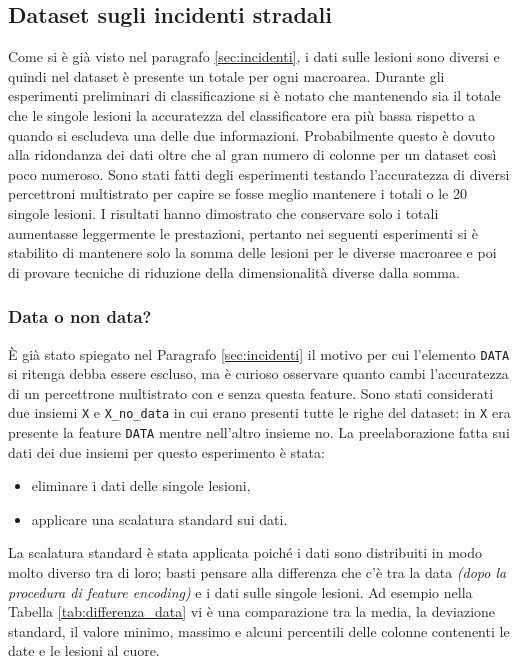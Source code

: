 \documentclass[12pt, twoside, letterpaper]{report}
\begin{document}
		\subsection{Dataset sugli incidenti stradali}
			Come si è già visto nel paragrafo \ref{sec:incidenti}, i dati sulle lesioni sono diversi e quindi nel dataset è presente un totale per ogni macroarea. Durante gli esperimenti preliminari di classificazione si è notato che mantenendo sia il totale che le singole lesioni la accuratezza del classificatore era più bassa rispetto a quando si escludeva una delle due informazioni. Probabilmente questo è dovuto alla ridondanza dei dati oltre che al gran numero di colonne per un dataset così poco numeroso. Sono stati fatti degli esperimenti testando l'accuratezza di diversi percettroni multistrato per capire se fosse meglio mantenere i totali o le 20 singole lesioni. I risultati hanno dimostrato che conservare solo i totali aumentasse leggermente le prestazioni, pertanto nei seguenti esperimenti si è stabilito di mantenere solo la somma delle lesioni per le diverse macroaree e poi di provare tecniche di riduzione della dimensionalità diverse dalla somma.
			
			\subsubsection{Data o non data?}			
				È già stato spiegato nel Paragrafo \ref{sec:incidenti} il motivo per cui l'elemento \texttt{DATA} si ritenga debba essere escluso, ma è curioso osservare quanto cambi l'accuratezza di un percettrone multistrato con e senza questa feature. Sono stati considerati due insiemi \texttt{X} e \texttt{X\_no\_data} in cui erano presenti tutte le righe del dataset: in \texttt{X} era presente la feature \texttt{DATA} mentre nell'altro insieme no. La preelaborazione fatta sui dati dei due insiemi per questo esperimento è stata: 
				\begin{itemize}
					\item eliminare i dati delle singole lesioni,
					\item applicare una scalatura standard sui dati.
				\end{itemize}
				La scalatura standard è stata applicata poiché i dati sono distribuiti in modo molto diverso tra di loro; basti pensare alla differenza che c'è tra la data \textit{(dopo la procedura di feature encoding)} e i dati sulle singole lesioni. Ad esempio nella Tabella \ref{tab:differenza_data} vi è una comparazione tra la media, la deviazione standard, il valore minimo, massimo e alcuni percentili delle colonne contenenti le date e le lesioni al cuore.
				
\end{document}
